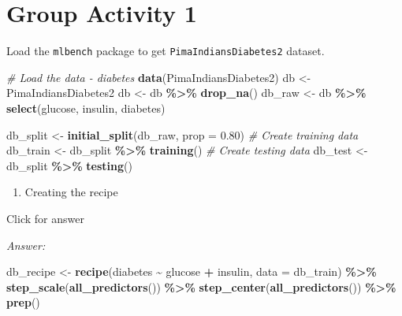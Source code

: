\documentclass[
]{book}
\newenvironment{Shaded}{\begin{snugshade}}{\end{snugshade}}
\newcommand{\AttributeTok}[1]{\textcolor[rgb]{0.13,0.29,0.53}{#1}}
\newcommand{\CommentTok}[1]{\textcolor[rgb]{0.56,0.35,0.01}{\textit{#1}}}
\newcommand{\FloatTok}[1]{\textcolor[rgb]{0.00,0.00,0.81}{#1}}
\newcommand{\FunctionTok}[1]{\textcolor[rgb]{0.13,0.29,0.53}{\textbf{#1}}}
\newcommand{\NormalTok}[1]{#1}
\newcommand{\OtherTok}[1]{\textcolor[rgb]{0.56,0.35,0.01}{#1}}
\newcommand{\SpecialCharTok}[1]{\textcolor[rgb]{0.81,0.36,0.00}{\textbf{#1}}}
\providecommand{\tightlist}{%
  \setlength{\itemsep}{0pt}\setlength{\parskip}{0pt}}
\begin{document}
\hypertarget{group-activity-1-8}{%
\section{Group Activity 1}\label{group-activity-1-8}}

Load the \texttt{mlbench} package to get \texttt{PimaIndiansDiabetes2} dataset.

\begin{Shaded}
\begin{Highlighting}[]
\CommentTok{\# Load the data {-} diabetes}
\FunctionTok{data}\NormalTok{(PimaIndiansDiabetes2)}
\NormalTok{db }\OtherTok{\textless{}{-}}\NormalTok{ PimaIndiansDiabetes2}
\NormalTok{db }\OtherTok{\textless{}{-}}\NormalTok{ db }\SpecialCharTok{\%\textgreater{}\%} \FunctionTok{drop\_na}\NormalTok{() }
\NormalTok{db\_raw }\OtherTok{\textless{}{-}}\NormalTok{ db }\SpecialCharTok{\%\textgreater{}\%} \FunctionTok{select}\NormalTok{(glucose, insulin, diabetes)}

\NormalTok{db\_split }\OtherTok{\textless{}{-}} \FunctionTok{initial\_split}\NormalTok{(db\_raw, }\AttributeTok{prop =} \FloatTok{0.80}\NormalTok{)}
\CommentTok{\# Create training data}
\NormalTok{db\_train }\OtherTok{\textless{}{-}}\NormalTok{ db\_split }\SpecialCharTok{\%\textgreater{}\%} \FunctionTok{training}\NormalTok{()}
\CommentTok{\# Create testing data}
\NormalTok{db\_test }\OtherTok{\textless{}{-}}\NormalTok{ db\_split }\SpecialCharTok{\%\textgreater{}\%} \FunctionTok{testing}\NormalTok{()}
\end{Highlighting}
\end{Shaded}

\begin{enumerate}
\def\labelenumi{\alph{enumi}.}
\tightlist
\item
  Creating the recipe
\end{enumerate}

Click for answer

\emph{Answer:}

\begin{Shaded}
\begin{Highlighting}[]
\NormalTok{db\_recipe }\OtherTok{\textless{}{-}} \FunctionTok{recipe}\NormalTok{(diabetes }\SpecialCharTok{\textasciitilde{}}\NormalTok{  glucose }\SpecialCharTok{+}\NormalTok{ insulin, }\AttributeTok{data =}\NormalTok{ db\_train) }\SpecialCharTok{\%\textgreater{}\%}
  \FunctionTok{step\_scale}\NormalTok{(}\FunctionTok{all\_predictors}\NormalTok{()) }\SpecialCharTok{\%\textgreater{}\%}
  \FunctionTok{step\_center}\NormalTok{(}\FunctionTok{all\_predictors}\NormalTok{()) }\SpecialCharTok{\%\textgreater{}\%} 
  \FunctionTok{prep}\NormalTok{()}
\end{Highlighting}
\end{Shaded}
\end{document}
